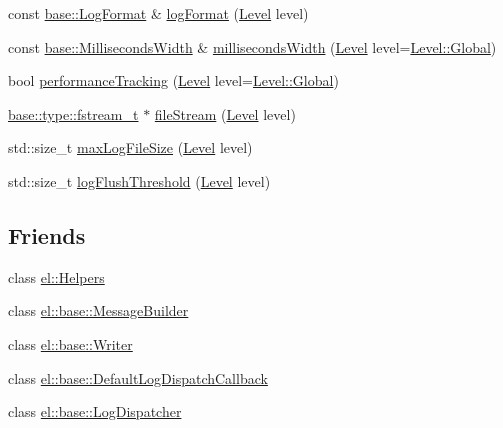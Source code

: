 \begin{DoxyCompactItemize}
const \hyperlink{classel_1_1base_1_1_log_format}{base\+::\+Log\+Format} \& \hyperlink{classel_1_1base_1_1_typed_configurations_a5d4d84a3dda6d54e0f291917703db441}{log\+Format} (\hyperlink{namespaceel_ab0ac6091262344c52dd2d3ad099e8e36}{Level} level)
\item 
const \hyperlink{classel_1_1base_1_1_milliseconds_width}{base\+::\+Milliseconds\+Width} \& \hyperlink{classel_1_1base_1_1_typed_configurations_ad078669014b01e587987e9ffc2214763}{milliseconds\+Width} (\hyperlink{namespaceel_ab0ac6091262344c52dd2d3ad099e8e36}{Level} level=\hyperlink{namespaceel_ab0ac6091262344c52dd2d3ad099e8e36a4cc6684df7b4a92b1dec6fce3264fac8}{Level\+::\+Global})
\item 
bool \hyperlink{classel_1_1base_1_1_typed_configurations_a0cef785df86dbfe17a27c5b78ed3e5da}{performance\+Tracking} (\hyperlink{namespaceel_ab0ac6091262344c52dd2d3ad099e8e36}{Level} level=\hyperlink{namespaceel_ab0ac6091262344c52dd2d3ad099e8e36a4cc6684df7b4a92b1dec6fce3264fac8}{Level\+::\+Global})
\item 
\hyperlink{namespaceel_1_1base_1_1type_a620c830ead75d26b45c060c211ee2685}{base\+::type\+::fstream\+\_\+t} $\ast$ \hyperlink{classel_1_1base_1_1_typed_configurations_abb8250bc165b182524521faef6bedb19}{file\+Stream} (\hyperlink{namespaceel_ab0ac6091262344c52dd2d3ad099e8e36}{Level} level)
\item 
std\+::size\+\_\+t \hyperlink{classel_1_1base_1_1_typed_configurations_aa48c0568be8fd177f1d463b1e7831f75}{max\+Log\+File\+Size} (\hyperlink{namespaceel_ab0ac6091262344c52dd2d3ad099e8e36}{Level} level)
\item 
std\+::size\+\_\+t \hyperlink{classel_1_1base_1_1_typed_configurations_ae8710257d7f8bc20c2183a3a4404ebaf}{log\+Flush\+Threshold} (\hyperlink{namespaceel_ab0ac6091262344c52dd2d3ad099e8e36}{Level} level)
\end{DoxyCompactItemize}
\subsection*{Friends}
\begin{DoxyCompactItemize}
\item 
class \hyperlink{classel_1_1base_1_1_typed_configurations_a2fb8a2c02cbf86247f093c118bed877a}{el\+::\+Helpers}
\item 
class \hyperlink{classel_1_1base_1_1_typed_configurations_a81bbf6fe31fab133d182efa8367304f1}{el\+::base\+::\+Message\+Builder}
\item 
class \hyperlink{classel_1_1base_1_1_typed_configurations_a7a728edbb2761d151832daa74d5b2736}{el\+::base\+::\+Writer}
\item 
class \hyperlink{classel_1_1base_1_1_typed_configurations_a42b1de96d584ae4fecbfc2b9aff95052}{el\+::base\+::\+Default\+Log\+Dispatch\+Callback}
\item 
class \hyperlink{classel_1_1base_1_1_typed_configurations_a9b37b28ea1c5f8f862cc89f135711d92}{el\+::base\+::\+Log\+Dispatcher}
\end{DoxyCompactItemize}
